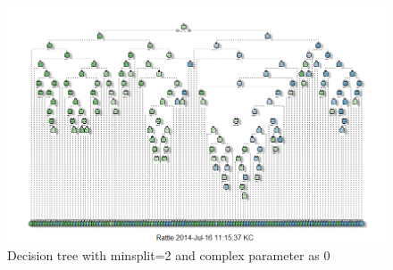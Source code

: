 \documentclass[a4paper,10pt]{report}\usepackage[]{graphicx}\usepackage[]{color}
\begin{document}
\begin{figure}[h]
  \includegraphics[width=\textwidth]{dt2}
  \caption{Decision tree with minsplit=2 and complex parameter as 0} \label{dt2}
\end{figure}
\end{document}
